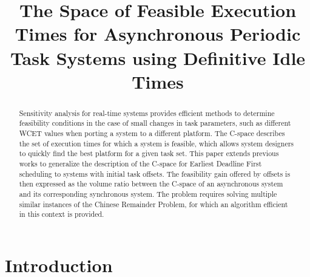 \documentclass[conference]{IEEEtran}
\begin{document}
\title{The Space of Feasible Execution Times for Asynchronous Periodic Task
Systems using Definitive Idle Times}


\author{
\and
{}
\and
{}
}

\maketitle

\begin{abstract}
	Sensitivity analysis for real-time systems provides efficient methods to determine feasibility
	conditions in the case of small changes in task parameters, such as
	different WCET values when porting a system to a different platform. The \mbox{C-space} describes the set of execution
	times for which a system is feasible, which allows system designers to quickly
	find the best platform for a given task set. This paper extends previous works
	to generalize the description of the C-space for Earliest Deadline First
	scheduling to systems with initial task offsets. The feasibility gain offered
	by offsets is then expressed as the volume ratio between the C-space of an
	asynchronous system and its corresponding synchronous system. The problem
	requires solving multiple similar instances of the Chinese Remainder Problem,
	for which an algorithm efficient in this context is provided.
\end{abstract}

%

\section{Introduction}
\end{document}
